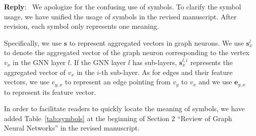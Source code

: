 \documentclass[12pt]{article}
\newcounter{reviewer}
\newcounter{point}[reviewer]
\newenvironment{reply}
   {\medskip \noindent \textbf{Reply}:\  }
   {\medskip}
\begin{document}
\begin{reply}
    We apologize for the confusing use of symbols.
    To clarify the symbol usage, we have unified the usage of symbols in the revised manuscript.
    After revision, each symbol only represents one meaning.
    
    Specifically, we use $\boldsymbol{s}$ to represent aggregated vectors in graph neurons.
    We use $\boldsymbol{s}^l_x$ to denote the aggregated vector of the graph neuron corresponding to the vertex $v_x$ in the GNN layer $l$.
    If the GNN layer $l$ has sub-layers, $\boldsymbol{s}^{l,i}_x$ represents the aggregated vector of $v_x$ in the $i$-th sub-layer.
    As for edges and their feature vectors, we use $e_{y,x}$ to represent an edge pointing from $v_y$ to $v_x$ and we use $\boldsymbol{e}_{y,x}$ to represent its feature vector.
    
    In order to facilitate readers to quickly locate the meaning of  symbols, we have added Table~\ref{tab:symbols} at the beginning of Section 2 ``Review of Graph Neural Networks'' in the revised manuscript.
    

\end{reply}
\end{document}
